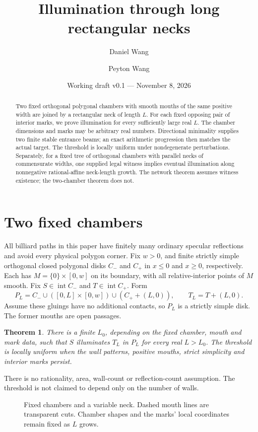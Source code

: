 \documentclass[11pt]{article}
\title{Illumination through long rectangular necks}
\author{Daniel Wang \and Peyton Wang}
\date{Working draft v0.1 --- November 8, 2026}
\newtheorem{theorem}{Theorem}[section]
\theoremstyle{definition}
\newcommand{\intr}{\operatorname{int}}
\begin{document}
\maketitle
\begin{abstract}
Two fixed orthogonal polygonal chambers with smooth mouths of the same positive width are joined by a rectangular neck of length $L$. For each fixed opposing pair of interior marks, we prove illumination for every sufficiently large real $L$. The chamber dimensions and marks may be arbitrary real numbers. Directional minimality supplies two finite stable entrance beams; an exact arithmetic progression then matches the actual target. The threshold is locally uniform under nondegenerate perturbations. Separately, for a fixed tree of orthogonal chambers with parallel necks of commensurate widths, one supplied legal witness implies eventual illumination along nonnegative rational-affine neck-length growth. The network theorem assumes witness existence; the two-chamber theorem does not.
\end{abstract}

\section{Two fixed chambers}
All billiard paths in this paper have finitely many ordinary specular reflections and avoid every physical polygon corner. Fix $w>0$, and finite strictly simple orthogonal closed polygonal disks $C_-$ and $C_+$ in $x\le0$ and $x\ge0$, respectively. Each has $M=\{0\}\times[0,w]$ on its boundary, with all relative-interior points of $M$ smooth. Fix $S\in\intr C_-$ and $T\in\intr C_+$. Form
\[
 P_L=C_-\cup([0,L]\times[0,w])\cup(C_++(L,0)),\qquad T_L=T+(L,0).
\]
Assume these gluings have no additional contacts, so $P_L$ is a strictly simple disk. The former mouths are open passages.

\begin{theorem}\label{thm:neck}
There is a finite $L_0$, depending on the fixed chamber, mouth and mark data, such that $S$ illuminates $T_L$ in $P_L$ for every real $L>L_0$. The threshold is locally uniform when the wall patterns, positive mouths, strict simplicity and interior marks persist.
\end{theorem}

There is no rationality, area, wall-count or reflection-count assumption. The threshold is not claimed to depend only on the number of walls.

\begin{figure}[htbp]\centering
{}
\caption{Fixed chambers and a variable neck. Dashed mouth lines are transparent cuts. Chamber shapes and the marks' local coordinates remain fixed as $L$ grows.}
\end{figure}
\end{document}
